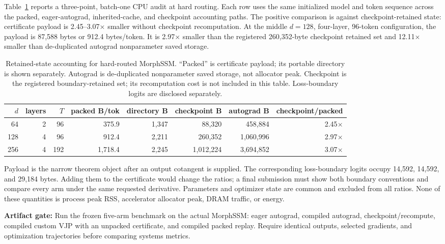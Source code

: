 \documentclass[10pt]{article}
\newcommand{\todo}[1]{\par\noindent\colorbox{Yellow!25}{\parbox{0.96\linewidth}{\textbf{Artifact gate:} #1}}\par}
\begin{document}
Table~\ref{tab:morphssm} reports a three-point, batch-one CPU audit at hard
routing.  Each row uses the same initialized model and token sequence across
the packed, eager-autograd, inherited-cache, and checkpoint accounting paths.
The positive comparison is against checkpoint-retained state: certificate
payload is 2.45--3.07$\times$ smaller without checkpoint recomputation.  At the
middle $d=128$, four-layer, 96-token configuration, the payload is 87,588 bytes
or 912.4 bytes/token.  It is 2.97$\times$ smaller than the registered
260,352-byte checkpoint retained set and 12.11$\times$ smaller than
de-duplicated autograd nonparameter saved storage.

\begin{table}[t]
\centering
\caption{Retained-state accounting for hard-routed MorphSSM.  ``Packed'' is
certificate payload; its portable directory is shown separately.  Autograd is
de-duplicated nonparameter saved storage, not allocator peak.  Checkpoint is
the registered boundary-retained set; its recomputation cost is not included
in this table.  Loss-boundary logits are disclosed separately.}
\label{tab:morphssm}
\small
\begin{tabular}{rrrrrrrr}
\toprule
$d$ & layers & $T$ & packed B/tok & directory B & checkpoint B & autograd B & checkpoint/packed \\
\midrule
64  & 2 & 96  & 375.9  & 1,347 & 88,320    & 458,884   & 2.45$\times$ \\
128 & 4 & 96  & 912.4  & 2,211 & 260,352   & 1,060,996 & 2.97$\times$ \\
256 & 4 & 192 & 1,718.4 & 2,245 & 1,012,224 & 3,694,852 & 3.07$\times$ \\
\bottomrule
\end{tabular}
\end{table}

Payload is the narrow theorem object after an output cotangent is supplied.
The corresponding loss-boundary logits occupy 14,592, 14,592, and 29,184
bytes.  Adding them to the certificate would change the ratios; a final
submission must show both boundary conventions and compare every arm under the
same requested derivative.  Parameters and optimizer state are common and
excluded from all ratios.  None of these quantities is process peak RSS,
accelerator allocator peak, DRAM traffic, or energy.

\todo{Run the frozen five-arm benchmark on the actual MorphSSM: eager
autograd, compiled autograd, checkpoint/recompute, compiled custom VJP with an
unpacked certificate, and compiled packed replay.  Require identical outputs,
selected gradients, and optimization trajectories before comparing systems
metrics.}
\end{document}
